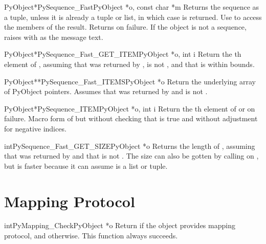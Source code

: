 \begin{cfuncdesc}{PyObject*}{PySequence_Fast}{PyObject *o, const char *m}
  Returns the sequence  as a tuple, unless it is already a
  tuple or list, in which case  is returned.  Use
   to access the members of the
  result.  Returns \NULL{} on failure.  If the object is not a
  sequence, raises  with  as the message
  text.
\end{cfuncdesc}

\begin{cfuncdesc}{PyObject*}{PySequence_Fast_GET_ITEM}{PyObject *o, int i}
  Return the th element of , assuming that  was
  returned by ,  is not \NULL,
  and that  is within bounds.
\end{cfuncdesc}

\begin{cfuncdesc}{PyObject**}{PySequence_Fast_ITEMS}{PyObject *o}
  Return the underlying array of PyObject pointers.  Assumes that
   was returned by  and
   is not \NULL.
\end{cfuncdesc}

\begin{cfuncdesc}{PyObject*}{PySequence_ITEM}{PyObject *o, int i}
  Return the th element of  or \NULL{} on failure.
  Macro form of  but without checking
  that  is true and without
  adjustment for negative indices.
\end{cfuncdesc}

\begin{cfuncdesc}{int}{PySequence_Fast_GET_SIZE}{PyObject *o}
  Returns the length of , assuming that  was
  returned by  and that  is
  not \NULL.  The size can also be gotten by calling
   on , but
   is faster because it can
  assume  is a list or tuple.
\end{cfuncdesc}


\section{Mapping Protocol \label{mapping}}

\begin{cfuncdesc}{int}{PyMapping_Check}{PyObject *o}
  Return  if the object provides mapping protocol, and
   otherwise.  This function always succeeds.
\end{cfuncdesc}


